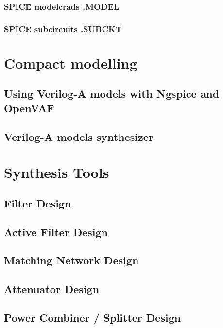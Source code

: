\subsubsection{SPICE modelcrads .MODEL}

\subsubsection{SPICE subcircuits .SUBCKT}

\section{Compact modelling}

\subsection{Using Verilog-A models with Ngspice and OpenVAF}

\subsection{Verilog-A models synthesizer}

\section{Synthesis Tools}
	\subsection{Filter Design}
	\subsection{Active Filter Design}
	\subsection{Matching Network Design}
	\clearpage
	\subsection{Attenuator Design}
		
	\clearpage
	\subsection{Power Combiner / Splitter Design}

\clearpage
\endinput


